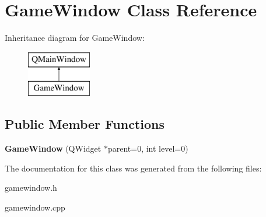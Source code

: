 \hypertarget{class_game_window}{\section{Game\+Window Class Reference}
\label{class_game_window}
}
Inheritance diagram for Game\+Window\+:\begin{figure}[H]
\begin{center}
\leavevmode
\includegraphics[height=2.000000cm]{class_game_window}
\end{center}
\end{figure}
\subsection*{Public Member Functions}
\begin{DoxyCompactItemize}
\item 
\hypertarget{class_game_window_a66368faf09314c3d4c30c9853de8fb20}{{\bfseries Game\+Window} (Q\+Widget $\ast$parent=0, int level=0)}\label{class_game_window_a66368faf09314c3d4c30c9853de8fb20}

\end{DoxyCompactItemize}


The documentation for this class was generated from the following files\+:\begin{DoxyCompactItemize}
\item 
gamewindow.\+h\item 
gamewindow.\+cpp\end{DoxyCompactItemize}
